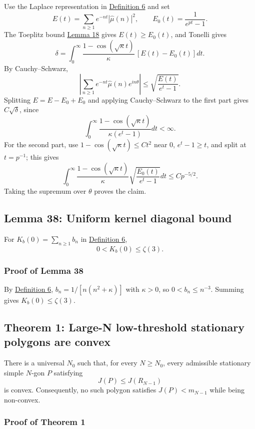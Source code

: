 \documentclass[11pt]{article}
\begin{document}
Use the Laplace representation in
\hyperref[def-positive-kernel]{Definition 6} and set \[
E(t)=\sum_{n\ge1}e^{-nt}|\widehat\mu(n)|^2,
\qquad E_0(t)=\frac1{e^{pt}-1}.
\] The Toeplitz bound \hyperref[lem-toeplitz-positive-atoms]{Lemma 18}
gives \(E(t)\ge E_0(t)\), and Tonelli gives \[
\delta=\int_0^\infty\frac{1-\cos(\sqrt\kappa t)}\kappa\,[E(t)-E_0(t)]dt.
\] By Cauchy--Schwarz, \[
\left|\sum_{n\ge1}e^{-nt}\widehat\mu(n)e^{in\theta}\right|
\le\sqrt{\frac{E(t)}{e^t-1}}.
\] Splitting \(E=E-E_0+E_0\) and applying Cauchy--Schwarz to the first
part gives \(C\sqrt\delta\), since \[
\int_0^\infty\frac{1-\cos(\sqrt\kappa t)}{\kappa(e^t-1)}dt<\infty.
\] For the second part, use \(1-\cos(\sqrt\kappa t)\le Ct^2\) near
\(0\), \(e^t-1\ge t\), and split at \(t=p^{-1}\); this gives \[
\int_0^\infty\frac{1-\cos(\sqrt\kappa t)}\kappa
\sqrt{\frac{E_0(t)}{e^t-1}}dt\le Cp^{-5/2}.
\] Taking the supremum over \(\theta\) proves the claim.

\subsection{Lemma 38: Uniform kernel diagonal
bound}\label{lem-kernel-diagonal-bound}

For \(K_b(0)=\sum_{n\ge1}b_n\) in
\hyperref[def-positive-kernel]{Definition 6}, \[
0<K_b(0)\le\zeta(3).
\]

\subsubsection{Proof of Lemma 38}\label{proof-lem-kernel-diagonal-bound}

By \hyperref[def-positive-kernel]{Definition 6},
\(b_n=1/[n(n^2+\kappa)]\) with \(\kappa>0\), so \(0<b_n\le n^{-3}\).
Summing gives \(K_b(0)\le\zeta(3)\).

\subsection{Theorem 1: Large-N low-threshold stationary polygons are
convex}\label{thm-main-large-n-convexity}

There is a universal \(N_0\) such that, for every \(N\ge N_0\), every
admissible stationary simple \(N\)-gon \(P\) satisfying \[
J(P)\le J(R_{N-1})
\] is convex. Consequently, no such polygon satisfies \(J(P)<m_{N-1}\)
while being non-convex.

\subsubsection{Proof of Theorem
1}\label{proof-thm-main-large-n-convexity}
\end{document}
